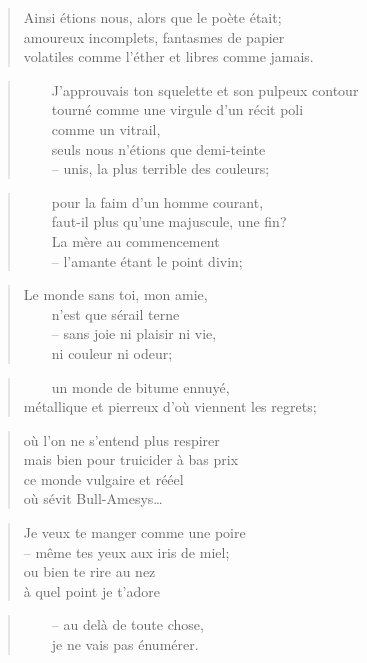   \begin{verse}
    Ainsi étions nous, alors que le poète était;\\
    amoureux incomplets, fantasmes de papier\\
    volatiles comme l’éther et libres comme jamais.
  \end{verse}
  \begin{verse}
    ~~~~J’approuvais ton squelette et son pulpeux contour\\
    ~~~~tourné comme une virgule d’un récit poli\\
    ~~~~comme un vitrail,\\
    ~~~~seuls nous n’étions que demi-teinte\\
    ~~~~-- unis, la plus terrible des couleurs;
  \end{verse}
  \begin{verse}
    ~~~~pour la faim d’un homme courant,\\
    ~~~~faut-il plus qu’une majuscule, une fin?\\
    ~~~~La mère au commencement\\
    ~~~~-- l’amante étant le point divin;
  \end{verse}
  \begin{verse}
    Le monde sans toi, mon amie,\\
    ~~~~n’est que sérail terne\\
    ~~~~-- sans joie ni plaisir ni vie,\\
    ~~~~ni couleur ni odeur;
  \end{verse}
  \begin{verse}
    ~~~~un monde de bitume ennuyé,\\
    métallique et pierreux d’où viennent les regrets;
  \end{verse}
  \begin{verse}
    où l’on ne s’entend plus respirer\\
    mais bien pour truicider à bas prix\\
    ce monde vulgaire et rééel\\
    où sévit Bull-Amesys…
  \end{verse}
  \begin{verse}
    Je veux te manger comme une poire\\
    -- même tes yeux aux iris de miel;\\
    ou bien te rire au nez\\
    à quel point je t’adore
  \end{verse}
  \begin{verse}
    ~~~~-- au delà de toute chose,\\
    ~~~~je ne vais pas énumérer.
  \end{verse}
